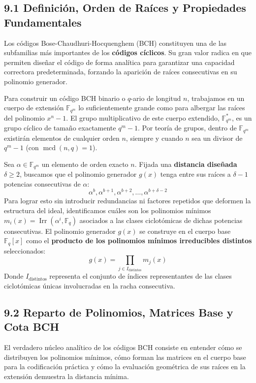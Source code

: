 \documentclass{article}
\begin{document}
\subsection{9.1 Definición, Orden de Raíces y Propiedades Fundamentales}

Los códigos Bose-Chaudhuri-Hocquenghem (BCH) constituyen una de las subfamilias más importantes de los \textbf{códigos cíclicos}. Su gran valor radica en que permiten diseñar el código de forma analítica para garantizar una capacidad correctora predeterminada, forzando la aparición de raíces consecutivas en su polinomio generador.

Para construir un código BCH binario o $q$-ario de longitud $n$, trabajamos en un cuerpo de extensión $\mathbb{F}_{q^m}$ lo suficientemente grande como para albergar las raíces del polinomio $x^n - 1$. El grupo multiplicativo de este cuerpo extendido, $\mathbb{F}_{q^m}^*$, es un grupo cíclico de tamaño exactamente $q^m - 1$. Por teoría de grupos, dentro de $\mathbb{F}_{q^m}$ existirán elementos de cualquier orden $n$, siempre y cuando $n$ sea un divisor de $q^m - 1$ (con $\operatorname{mcd}(n,q)=1$). 

Sea $\alpha \in \mathbb{F}_{q^m}$ un elemento de orden exacto $n$. Fijada una \textbf{distancia diseñada} $\delta \ge 2$, buscamos que el polinomio generador $g(x)$ tenga entre sus raíces a $\delta-1$ potencias consecutivas de $\alpha$:
\[
\alpha^b, \alpha^{b+1}, \alpha^{b+2}, \dots, \alpha^{b+\delta-2}
\]
Para lograr esto sin introducir redundancias ni factores repetidos que deformen la estructura del ideal, identificamos cuáles son los polinomios mínimos $m_i(x) = \operatorname{Irr}(\alpha^i, \mathbb{F}_q)$ asociados a las clases ciclotómicas de dichas potencias consecutivas. El polinomio generador $g(x)$ se construye en el cuerpo base $\mathbb{F}_q[x]$ como el \textbf{producto de los polinomios mínimos irreducibles distintos} seleccionados:
\[
g(x) = \prod_{j \in I_{\text{distintos}}} m_j(x)
\]
Donde $I_{\text{distintos}}$ representa el conjunto de índices representantes de las clases ciclotómicas únicas involucradas en la racha consecutiva.

\subsection{9.2 Reparto de Polinomios, Matrices Base y Cota BCH}

El verdadero núcleo analítico de los códigos BCH consiste en entender cómo se distribuyen los polinomios mínimos, cómo forman las matrices en el cuerpo base para la codificación práctica y cómo la evaluación geométrica de sus raíces en la extensión demuestra la distancia mínima.
\end{document}
